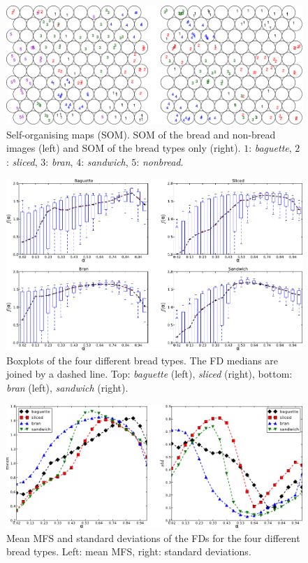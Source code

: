 \begin{figure}[h!]
\begin{centering}
\includegraphics{SOM}
\caption{Self-organising maps (SOM). SOM of the bread and non-bread images (left) and SOM of the bread types only (right). $1$: {\em baguette}, $2$: {\em sliced}, $3$: {\em bran}, $4$: {\em sandwich}, $5$: {\em nonbread}.}
\label{fig:somfractal}
\end{centering}
\end{figure}

\begin{figure}[h!]
\centering
\includegraphics{boxplots}
\caption{Boxplots of the four different bread types. The FD medians are joined by a dashed line. Top: {\em baguette} (left), {\em sliced} (right), bottom: {\em bran} (left), {\em sandwich} (right).}
\label{fig:boxplotsMFS}
\end{figure}

\begin{figure}[h!]
\centering
\includegraphics{panstd}
\caption{Mean MFS and standard deviations of the FDs for the four different bread types. Left: mean MFS, right: standard deviations.}
\label{fig:meansMFS}
\end{figure}


